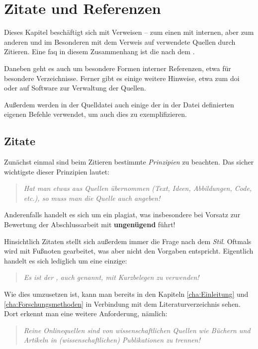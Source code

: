 \chapter{Zitate und Referenzen}
\label{cha:ZitateReferenzen}
% 
Dieses Kapitel beschäftigt sich mit Verweisen -- zum einen mit internen, aber zum anderen und im Besonderen
mit dem Verweis auf verwendete Quellen durch Zitieren. Eine \gls{faq} in diesem Zusammenhang ist die nach 
dem . 
%
%

Daneben geht es auch um besondere Formen interner Referenzen, etwa für besondere Verzeichnisse. Ferner
gibt es einige weitere Hinweise, etwa zum \gls{doi} oder auf Software zur Verwaltung der Quellen.

Außerdem werden in der
Quelldatei  auch einige der in der Datei  
definierten eigenen Befehle verwendet, um auch dies zu exemplifizieren.
%
\section{Zitate}
\label{sec:ZR-Zitate}
%
Zunächst einmal sind beim Zitieren bestimmte \emph{Prinzipien} zu beachten. Das sicher wichtigste
dieser Prinzipien lautet:
%
\begin{quote}
\textsl{Hat man etwas aus Quellen
übernommen (Text, Ideen, Abbildungen, Code, etc.), so muss man die Quelle auch angeben!}
\end{quote}
%
Anderenfalls handelt es sich um ein \gls{plagiat}, was insbesondere bei Vorsatz zur Bewertung der
Abschlussarbeit mit \textbf{ungenügend} führt!

Hinsichtlich Zitaten stellt sich außerdem immer die Frage nach dem \emph{Stil}. Oftmals wird mit Fußnoten
gearbeitet, was aber nicht den Vorgaben entspricht. Eigentlich handelt es sich lediglich um eine einzige:
%
\begin{quote}
\textsl{Es ist der , auch  genannt, mit
Kurzbelegen zu verwenden! \parencite[s.][]{Wikipedia2010}}
\end{quote}
%
Wie dies umzusetzen ist, kann man bereits in den Kapiteln \ref{cha:Einleitung} und \ref{cha:Forschungsmethoden}
in Verbindung mit dem Literaturverzeichnis sehen. Dort erkennt man eine weitere Anforderung, nämlich:
%
\begin{quote}
\textsl{Reine Onlinequellen sind von wissenschaftlichen Quellen wie Büchern und Artikeln in 
(wissenschaftlichen) Publikationen zu trennen!}
\end{quote}
%

